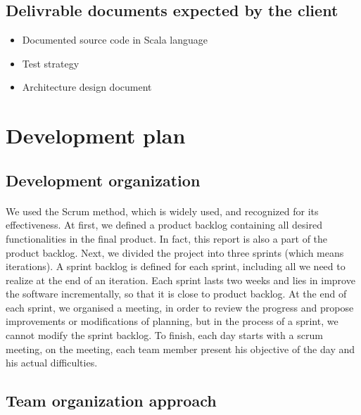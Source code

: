 \documentclass{report}
\begin{document}
\subsection{Delivrable documents expected by the client}

\vspace{3mm}
\begin{itemize}
\item Documented source code in Scala language\vspace{1mm}
\item Test strategy\vspace{1mm}
\item Architecture design document\vspace{1mm}
\end{itemize}

\section{Development plan}

\subsection{Development organization}

\paragraph{}
\hspace{4mm}\textnormal{We used the Scrum method, which is widely used, 
and recognized for its effectiveness. At first, 
we defined a product backlog containing all desired 
functionalities in the final product. In fact, this report is also a part 
of the product backlog. Next, we divided the project into three
 sprints (which means iterations). A sprint backlog is defined for 
each sprint, including all we need to realize at the end of an 
iteration. Each sprint lasts two weeks and lies in improve the 
software incrementally, so that it is close to product backlog. 
At the end of each sprint, we organised a meeting, in order to 
review the progress and propose improvements or modifications
 of planning, but in the process of a sprint, we cannot modify the 
sprint backlog. To finish, each day starts with a scrum meeting, on 
the meeting, each team member present his objective of the day
 and his actual difficulties.}

\subsection{Team organization approach}
\end{document}
